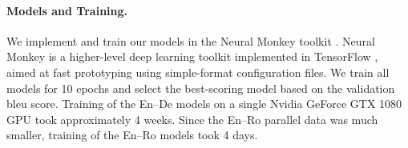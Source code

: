 \paragraph{Models and Training.}
We implement and train our models in the Neural Monkey toolkit
\citep{helcl-libovicky-2017-neural,helcl-etal-2018-neural}. Neural Monkey is a
higher-level deep learning toolkit implemented in TensorFlow
\citep{tensorflow2015-whitepaper}, aimed at fast prototyping using
simple-format configuration files. We train all models for 10 epochs and select
the best-scoring model based on the validation \acs{bleu} score. Training of
the En--De models on a single Nvidia GeForce GTX 1080 GPU took approximately 4
weeks. Since the En--Ro parallel data was much smaller, training of the En--Ro
models took 4 days.



